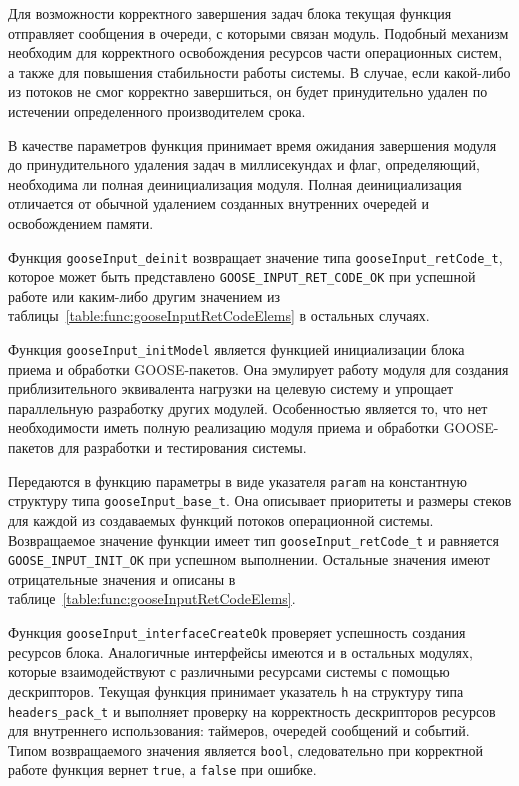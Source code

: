 Для возможности корректного завершения задач блока текущая
функция отправляет сообщения в очереди, с которыми связан модуль.
Подобный механизм необходим для корректного освобождения ресурсов части
операционных систем, а также для повышения стабильности работы системы.
В случае, если какой-либо из потоков не смог корректно завершиться,
он будет принудительно удален по истечении определенного производителем срока.

В качестве параметров функция принимает время ожидания завершения модуля до принудительного удаления задач в миллисекундах и флаг, определяющий, необходима ли полная деинициализация модуля. Полная деинициализация отличается от обычной удалением созданных внутренних очередей и освобождением памяти.

Функция \lstinline{gooseInput_deinit} возвращает значение типа \lstinline{gooseInput_retCode_t}, которое может быть представлено \lstinline{GOOSE_INPUT_RET_CODE_OK} при успешной работе или
каким-либо другим значением из таблицы~\ref{table:func:gooseInputRetCodeElems}
в остальных случаях.

Функция \lstinline{gooseInput_initModel} является функцией инициализации блока приема и обработки GOOSE-пакетов.
Она эмулирует работу модуля для создания приблизительного эквивалента нагрузки на
целевую систему и
упрощает параллельную разработку других модулей. Особенностью является то, что нет необходимости иметь полную реализацию модуля приема и обработки GOOSE-пакетов для разработки и тестирования системы.

Передаются в функцию параметры в виде указателя \lstinline{param} на константную структуру типа \lstinline{gooseInput_base_t}. Она описывает приоритеты и
размеры стеков для каждой из создаваемых функций потоков
операционной системы.
Возвращаемое значение функции имеет тип \lstinline{gooseInput_retCode_t} и равняется \lstinline{GOOSE_INPUT_INIT_OK} при успешном выполнении. Остальные значения
имеют отрицательные значения и описаны
в таблице~\ref{table:func:gooseInputRetCodeElems}.

Функция \lstinline{gooseInput_interfaceCreateOk} проверяет успешность создания
ресурсов блока. Аналогичные интерфейсы имеются и в остальных модулях, которые
взаимодействуют с различными ресурсами системы с помощью дескрипторов.
Текущая функция принимает указатель \lstinline{h}
на структуру типа \lstinline{headers_pack_t} и выполняет проверку
на корректность дескрипторов ресурсов для внутреннего использования:
таймеров, очередей сообщений и событий.
Типом возвращаемого значения является \lstinline{bool}, следовательно при корректной работе функция вернет \lstinline{true}, а \lstinline{false} при ошибке.

